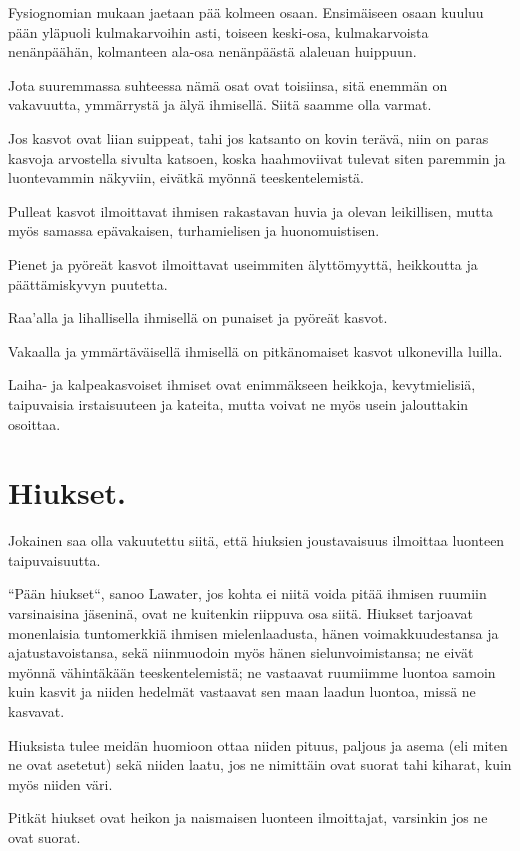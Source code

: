 \documentclass[11pt, twoside, finnish, a5paper]{book}
\begin{document}
Fysiognomian mukaan jaetaan pää kolmeen osaan.
Ensimäiseen osaan kuuluu pään yläpuoli kulmakarvoihin
asti, toiseen keski-osa, kulmakarvoista nenänpäähän,
kolmanteen ala-osa nenänpäästä alaleuan huippuun.

Jota suuremmassa suhteessa nämä osat ovat toisiinsa,
sitä enemmän on vakavuutta, ymmärrystä ja älyä
ihmisellä. Siitä saamme olla varmat.

Jos kasvot ovat liian suippeat, tahi jos katsanto on
kovin terävä, niin on paras kasvoja arvostella sivulta
katsoen, koska haahmoviivat tulevat siten paremmin ja
luontevammin näkyviin, eivätkä myönnä teeskentelemistä.

Pulleat kasvot ilmoittavat ihmisen rakastavan huvia
ja olevan leikillisen, mutta myös samassa epävakaisen,
turhamielisen ja huonomuistisen.

Pienet ja pyöreät kasvot ilmoittavat useimmiten
älyttömyyttä, heikkoutta ja päättämiskyvyn puutetta.

Raa'alla ja lihallisella ihmisellä on punaiset ja pyöreät
kasvot.

Vakaalla ja ymmärtäväisellä ihmisellä on pitkänomaiset
kasvot ulkonevilla luilla.

Laiha- ja kalpeakasvoiset ihmiset ovat enimmäkseen
heikkoja, kevytmielisiä, taipuvaisia irstaisuuteen ja
kateita, mutta voivat ne myös usein jalouttakin osoittaa.

\chapter*{Hiukset.}

Jokainen saa olla vakuutettu siitä, että hiuksien
joustavaisuus ilmoittaa luonteen taipuvaisuutta.

``Pään hiukset``, sanoo Lawater, jos kohta ei niitä
voida pitää ihmisen ruumiin varsinaisina jäseninä, ovat
ne kuitenkin riippuva osa siitä.
 Hiukset tarjoavat
monenlaisia tuntomerkkiä ihmisen mielenlaadusta, hänen
voimakkuudestansa ja ajatustavoistansa, sekä niinmuodoin
myös hänen sielunvoimistansa; ne eivät myönnä vähintäkään
teeskentelemistä; ne vastaavat ruumiimme luontoa samoin
kuin kasvit ja niiden hedelmät vastaavat sen maan laadun
luontoa, missä ne kasvavat.

Hiuksista tulee meidän huomioon ottaa niiden pituus,
paljous ja asema (eli miten ne ovat asetetut) sekä niiden
laatu, jos ne nimittäin ovat suorat tahi kiharat, kuin
myös niiden väri.

Pitkät hiukset ovat heikon ja naismaisen luonteen
ilmoittajat, varsinkin jos ne ovat suorat.
\end{document}

